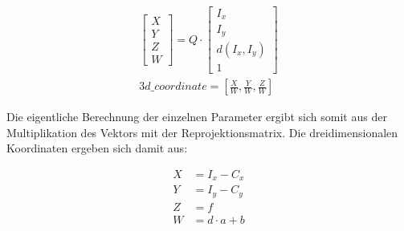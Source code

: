 \begin{equation}\label{eq:distance_calculation}
    \begin{aligned}
        \begin{bmatrix}
            X\\ Y \\ Z\\ W
        \end{bmatrix}
        = Q \cdot 
        \begin{bmatrix}
            I_x\\ I_y \\ d(I_x,I_y)\\ 1
        \end{bmatrix}\\
        3d\_coordinate = [\frac{X}{W}, \frac{Y}{W}, \frac{Z}{W} ]
    \end{aligned}
\end{equation}

\noindent
Die eigentliche Berechnung der einzelnen Parameter ergibt sich somit aus der Multiplikation des Vektors mit der Reprojektionsmatrix. Die dreidimensionalen Koordinaten ergeben sich damit aus:

\begin{equation}
  \begin{aligned}
        X &= I_x - C_x\\
        Y &= I_y - C_y\\
        Z &= f\\
        W &= d \cdot a + b
  \end{aligned}
\end{equation}